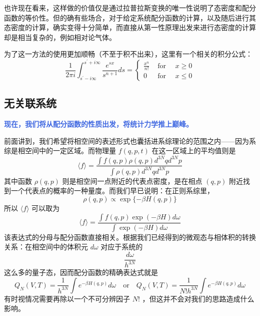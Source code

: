 \documentclass[hyperref,UTF-8]{ctexbook}
\newcommand{\0}{\boldsymbol{0}}
\begin{document}
也许现在看来，这样做的价值仅是通过拉普拉斯变换的唯一性说明了态密度和配分函数的等价性。但的确有些场合，对于给定系统配分函数的计算，以及随后进行其态密度的计算，确实变得十分简单，而直接从第一性原理出发来进行态密度的计算却是相当复杂的，例如相对论气体。

为了这一方法的使用更加顺畅（不至于积不出来），这里有一个相关的积分公式：
\[
    \frac{1}{2 \pi i} \int_{s^{\prime}-i \infty}^{s^{\prime}+i \infty} \frac{e^{s x}}{s^{n+1}} d s=\left\{\begin{array}{lll}
        \frac{x^n}{n !} & \text { for } \quad x \geq 0 \\
        0 & \text { for } \quad x \leq 0
        \end{array}\right.
\]

\subsection{无关联系统}
\textcolor{RoyalBlue}{\textbf{\kaishu 现在，我们将从配分函数的性质出发，将统计力学推上巅峰。}}

前面讲到，我们希望将相空间的表述形式也囊括进系综理论的范围之内——因为系综是相空间中的一定区域。而物理量 $f(q,p,t)$ 在这一区域上的平均值则是
\begin{equation}
    \langle f\rangle=\frac{\int f(q, p) \rho(q, p) d^{3 N} q d^{3 N} p}{\int \rho(q, p) d^{3 N} q d^{3 N} p}
\end{equation}
其中函数 $\rho(q,p)$ 则是相空间一点附近的代表点密度，是在相点 $(q,p)$ 附近找到一个代表点的概率的一种量度。而我们早已说明：在正则系综里，
\begin{equation}
    \rho(q, p) \propto \exp \{-\beta H(q, p)\}
\end{equation}
所以 $\langle f \rangle$ 可以取为
\begin{equation}
    \langle f\rangle=\frac{\int f(q, p) \exp (-\beta H) d \omega}{\int \exp (-\beta H) d \omega}
\end{equation}
该表达式的分母与配分函数直接相关。根据我们已经得到的微观态与相体积的转换关系：在相空间中的体积元 $d\omega$ 对应于系统的
\[
    \frac{d\omega}{h^{3N}} 
\]
这么多的量子态，因而配分函数的精确表达式就是
\begin{equation}\label{equ:phaseintegrate}
    Q_N(V, T)=\frac{1}{ h^{3 N}} \int e^{-\beta H(q, p)} d \omega\quad\text{or}\quad Q_N(V, T)=\frac{1}{N! h^{3 N}} \int e^{-\beta H(q, p)} d \omega
\end{equation}
有时视情况需要再除以一个不可分辨因子 $N!$ ，但这并不会对我们的思路造成什么影响。
\end{document}
